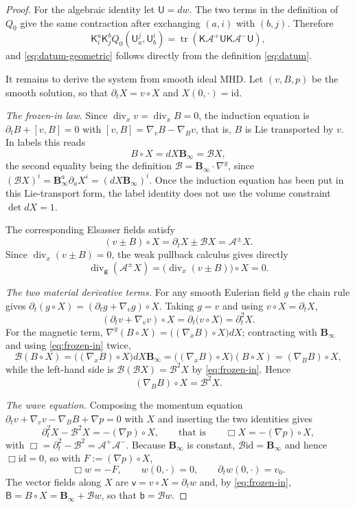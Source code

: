 \documentclass[11pt,reqno]{amsart}
\theoremstyle{plain}
\theoremstyle{definition}
\theoremstyle{remark}
\numberwithin{equation}{section}
\DeclareMathOperator{\Div}{div}
\DeclareMathOperator{\tr}{tr}
\newcommand{\Ufield}{\mathsf U}
\newcommand{\Kmat}{\mathsf K}
\newcommand{\vLag}{\mathsf v}
\newcommand{\BLag}{\mathsf B}
\newcommand{\bLag}{\mathsf b}
\newcommand{\gmetric}{\mathbf g}
\newcommand{\Binf}{\mathbf B_\infty}
\begin{document}
\begin{proof}
For the algebraic identity let $\Ufield=dw$.  The two terms in the definition
of $Q_0$ give the same contraction after exchanging $(a,i)$ with $(b,j)$.
Therefore
\[
 \Kmat^a_i\Kmat^b_jQ_0(\Ufield_a^j,\Ufield_b^i)
 =\tr \left(
   \Kmat\mathcal A^+\Ufield\Kmat\mathcal A^-\Ufield\right),
\]
and \eqref{eq:datum-geometric} follows directly from the definition \eqref{eq:datum}.
 
It remains to derive the system from smooth ideal MHD.  Let $(v,B,p)$ be the
smooth solution, so that $\partial_tX=v\circ X$ and $X(0,\cdot)=\mathrm{id}$.
 
\emph{The frozen-in law.}  Since $\Div_xv=\Div_xB=0$, the induction equation is
$\partial_tB+[v,B]=0$ with $[v,B]=\nabla_vB-\nabla_Bv$, that is, $B$ is Lie
transported by $v$.  In labels this reads
\begin{equation}\label{eq:frozen-in}
 B\circ X=dX\Binf=\mathcal BX ,
\end{equation}
the second equality being the definition $\mathcal B=\Binf\cdot\nabla^{y}$,
since $(\mathcal BX)^i=\Binf^a\partial_aX^i=(dX\Binf)^i$. Once the induction
equation has been put in this Lie-transport form, the label identity does not
use the volume constraint $\det dX=1$.

The corresponding Elsasser fields satisfy
\[
 (v\pm B)\circ X=\partial_tX\pm\mathcal BX=\mathcal A^\pm X.
\]
Since $\Div_x(v\pm B)=0$, the weak pullback calculus gives directly
\[
 \Div_{\gmetric}(\mathcal A^\pm X)
 =\bigl(\Div_x(v\pm B)\bigr)\circ X=0.
\]
 
\emph{The two material derivative terms.}  For any smooth Eulerian field $g$ the chain
rule gives $\partial_t(g\circ X)=(\partial_tg+\nabla_vg)\circ X$.  Taking $g=v$
and using $v\circ X=\partial_tX$,
\[
 (\partial_tv+\nabla_vv)\circ X=\partial_t\big(v\circ X\big)=\partial_t^2X .
\]
For the magnetic term, $\nabla^{y}(B\circ X)=\big((\nabla_xB)\circ X\big)dX$;
contracting with $\Binf$ and using \eqref{eq:frozen-in} twice,
\[
 \mathcal B(B\circ X)
 =\big((\nabla_xB)\circ X\big)dX\Binf
 =\big((\nabla_xB)\circ X\big)(B\circ X)
 =(\nabla_BB)\circ X ,
\]
while the left-hand side is $\mathcal B(\mathcal BX)=\mathcal B^2X$ by \eqref{eq:frozen-in}.  Hence
\[
 (\nabla_BB)\circ X=\mathcal B^2X .
\]
 
\emph{The wave equation.}  Composing the momentum equation
$\partial_tv+\nabla_vv-\nabla_BB+\nabla p=0$ with $X$ and inserting the two
identities gives
\[
 \partial_t^2X-\mathcal B^2X=-(\nabla p)\circ X ,
 \qquad\text{that is}\qquad
 \Box X=-(\nabla p)\circ X ,
\]
with $\Box=\partial_t^2-\mathcal B^2=\mathcal A^+\mathcal A^-$.  Because
$\Binf$ is constant, $\mathcal B\mathrm{id}=\Binf$ and hence
$\Box\mathrm{id}=0$, so with $F:=(\nabla p)\circ X$,
\[
 \Box w=-F ,
 \qquad
 w(0,\cdot)=0 ,
 \qquad
 \partial_tw(0,\cdot)=v_0 .
\]
The vector fields along $X$ are $\vLag=v\circ X=\partial_tw$ and, by
\eqref{eq:frozen-in}, $\BLag=B\circ X=\Binf+\mathcal Bw$, so that
$\bLag=\mathcal Bw$.
 

\end{proof}
\end{document}
